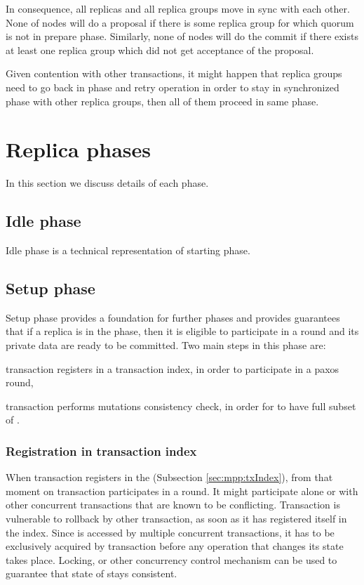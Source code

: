 In consequence, all replicas and all replica groups move in sync with each other. None of nodes will do a proposal if there is some replica group for which quorum is not in prepare phase. 
Similarly, none of nodes will do the commit if there exists at least one replica group which did not get acceptance of the proposal.  

Given contention with other transactions, it might happen that replica groups need to go back in phase and retry operation in order to stay in synchronized phase with other replica groups, then all of them proceed in same phase.

\section{Replica phases}
In this section we discuss details of each phase.

\subsection{Idle phase}
Idle phase is a technical representation of starting phase.

\subsection{Setup phase}
Setup phase provides a foundation for further phases and provides guarantees that if a replica is in the phase, then it is eligible to participate in a \paxos round and its private data are ready to be committed. Two main steps in this phase are: \begin{enumerate*}
\item transaction registers in a transaction index, in order to participate in a paxos round,
\item transaction performs mutations consistency check, in order for  to have full subset of \mutations.
\end{enumerate*}


\subsubsection{Registration in transaction index}
When transaction registers in the \txIndex (Subsection \ref{sec:mpp:txIndex}), from that moment on transaction participates in a \paxos round.
It might participate alone or with other concurrent transactions that are known to be conflicting. 
Transaction is vulnerable to rollback by other transaction, as soon as it has registered itself in the index.
Since \txIndex is accessed by multiple concurrent transactions, it has to be exclusively acquired by transaction before any operation that changes its state takes place. 
Locking, or other concurrency control mechanism can be used to guarantee that state of \txIndex stays consistent.


